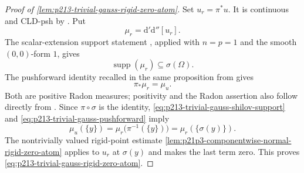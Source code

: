\begin{proof}[Proof of
\cref{lem:p213-trivial-gauss-rigid-zero-atom}]
Set $u_r=\pi^*u$.  It is continuous and CLD-psh by
\cite[Proposition~8.1.5]{CLD25}.  Put
\[
                         \mu_r=\mathrm d'\mathrm d''[u_r].
\]
The scalar-extension support statement
\cite[Proposition~16.8.2]{CLD25}, applied with $n=p=1$ and the smooth
$(0,0)$-form $1$, gives
\begin{equation}
\label{eq:p213-trivial-gauss-shilov-support}
                         \operatorname{supp}(\mu_r)
                         \subseteq\sigma(\Omega).
\end{equation}
The pushforward identity recalled in the same proposition from
\cite[Proposition~8.7.5]{CLD25} gives
\begin{equation}
\label{eq:p213-trivial-gauss-pushforward}
                         \pi_*\mu_r=\mu_u.
\end{equation}
Both are positive Radon measures; positivity and the Radon assertion also
follow directly from \cite[Lemma~8.5.5 and Proposition~7.2.8]{CLD25}.
Since $\pi\circ\sigma$ is the identity,
\eqref{eq:p213-trivial-gauss-shilov-support} and
\eqref{eq:p213-trivial-gauss-pushforward} imply
\begin{equation}
\label{eq:p213-trivial-gauss-atom-transfer}
             \mu_u(\{y\})
             =\mu_r\bigl(\pi^{-1}(\{y\})\bigr)
             =\mu_r(\{\sigma(y)\}).
\end{equation}
The nontrivially valued rigid-point estimate
\cref{lem:p21p3-componentwise-normal-rigid-zero-atom} applies to
$u_r$ at $\sigma(y)$ and makes the last term zero.  This proves
\eqref{eq:p213-trivial-gauss-rigid-zero-atom}.
\end{proof}
